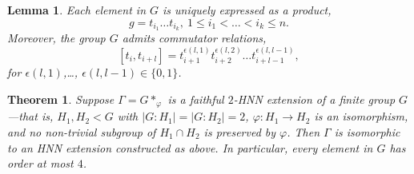 \documentclass[10pt,a4paper]{amsart}
\newtheorem{thm}{Theorem}
\newtheorem{lem}{Lemma}
\begin{document}
\begin{lem}\label{lem:comm}
    Each element in $G$ is uniquely expressed as a product,
    \[
    g = t_{i_1}\dots t_{i_k},\ 1\leq i_1<\dots < i_k\leq n.
    \]
    Moreover, the group $G$ admits commutator relations,
    \[
    [t_i,t_{i+l}] = t_{i+1}^{\epsilon(l,1)}t_{i+2}^{\epsilon(l,2)}\dots t_{i+l-1}^{\epsilon(l,l-1)},
    \]
    for $\epsilon(l,1)$,\dots, $\epsilon(l,l-1)\in \{0,1\}$.
\end{lem}

\begin{thm}\label{thm:HNN_rigidity}
    Suppose $\Gamma = G*_{\varphi}$ is a faithful $2$-HNN extension of a finite group $G$—that is, $H_1,H_2 < G$ with $\lvert G:H_1\rvert = \lvert G:H_2\rvert = 2$, $\varphi: H_1 \to H_2$ is an isomorphism, and no non-trivial subgroup of $H_1 \cap H_2$ is preserved by $\varphi$. Then $\Gamma$ is isomorphic to an HNN extension constructed as above. In particular, every element in $G$ has order at most $4$.
\end{thm}
\end{document}
